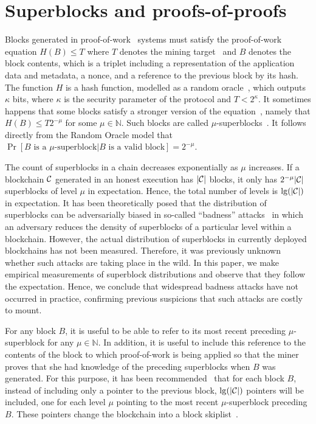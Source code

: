 \section{Superblocks and proofs-of-proofs}

Blocks generated in proof-of-work~\cite{C:DwoNao92} systems must satisfy the
proof-of-work equation $H(B) \leq T$ where $T$ denotes the mining
target~\cite{SP:BMCNKF15} and $B$ denotes the block contents, which is a triplet
including a representation of the application data and metadata, a nonce, and a
reference to the previous block by its hash. The function $H$ is a hash
function, modelled as a random oracle~\cite{CCS:BelRog93}, which outputs
$\kappa$ bits, where $\kappa$ is the security parameter of the protocol and $T <
2^\kappa$. It sometimes happens that some blocks satisfy a stronger version of
the equation~\cite{popow}, namely that $H(B) \leq T2^{-\mu}$ for some $\mu \in
\mathbb{N}$. Such blocks are called $\mu$-superblocks~\cite{nipopows}.
It follows directly from the Random Oracle model that
$\Pr[B \text{ is a } \mu\text{-superblock}|B \text{ is a valid block}] = 2^{-\mu}$.

The count of superblocks in a chain decreases exponentially as $\mu$ increases.
If a blockchain $\mathcal{C}$ generated in an honest execution has $|\mathcal{C}|$ blocks,
it only has $2^{-\mu}|\mathcal{C}|$ superblocks of level $\mu$ in expectation. Hence,
the total number of levels is $\lg(|\mathcal{C}|)$ in expectation. It has been
theoretically posed that the distribution of superblocks can be adversarially
biased in so-called ``badness'' attacks~\cite{nipopows} in which an adversary
reduces the density of superblocks of a particular level within a blockchain.
However, the actual distribution of superblocks in currently deployed
blockchains has not been measured. Therefore, it was previously unknown whether
such attacks are taking place in the wild. In this paper, we make empirical
measurements of superblock distributions and observe that they follow the
expectation. Hence, we conclude that widespread badness attacks have not
occurred in practice, confirming previous suspicions that such attacks are
costly to mount.

For any block $B$,
it is useful to be able to refer to its most recent preceding $\mu$-superblock
for any $\mu \in \mathbb{N}$. In addition, it is useful to include this
reference to the contents of the block to which proof-of-work is being applied
so that the miner proves that she had knowledge of the preceding superblocks
when $B$ was generated. For this purpose, it has been
recommended~\cite{nipopows} that for each block $B$, instead of including only a
pointer to the previous block, $\lg(|\mathcal{C}|)$ pointers will be included, one
for each level $\mu$ pointing to the most recent $\mu$-superblock preceding $B$.
These pointers change the blockchain into a block
skiplist~\cite{skiplist,papadakis1993skip}.

